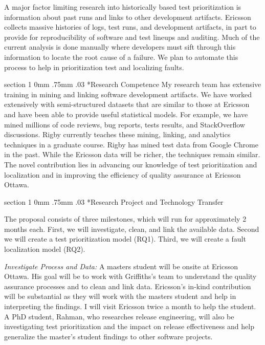 \documentclass[12pt, letterpaper]{article}
\makeatletter
\renewcommand{\section}{\@startsection
{section}%
{1}%
{0mm}%
{.75mm}
{.03\baselineskip}%
{\normalfont\large\bf} %
}
\makeatother
\begin{document}
A major factor limiting research into historically based test prioritization
is information about past runs and links to other development artifacts.
Ericsson collects massive histories of logs, test runs, and development
artifacts, in part to provide for reproducibility of software and test lineups
and auditing. Much of the current analysis is done manually where developers
must sift through this information to locate the root cause of a failure. We
plan to automate this process to help in prioritization test and localizing
faults.

\section*{Research Competence} My research team has extensive training in
mining and linking software development artifacts. We have worked extensively
with semi-structured datasets that are similar to those at Ericsson and have been
able to provide useful statistical models. For example, we have mined millions
of code reviews, bug reports, tests results, and  StackOverflow discussions.
Rigby currently teaches these mining, linking, and analytics techniques in a
graduate course. Rigby has mined test data from Google Chrome in the past.
While the Ericsson data will be richer, the techniques remain similar.
The novel contribution lies in advancing our knowledge of test prioritization
and localization and in improving the efficiency of quality assurance at
Ericsson Ottawa.

\section*{Research Project and Technology Transfer}

The proposal consists of three milestones, which will run for
approximately 2 months each. First, we will investigate, clean, and link the
available data. Second we will create a test prioritization model (RQ1). Third,
we will create a fault localization model (RQ2).

{\it Investigate Process and Data:} A masters student will be onsite at Ericsson
Ottawa. His goal will be to work with Griffiths's team to understand the
quality assurance processes and to clean and link data. Ericsson’s in-kind
contribution will be substantial as they will work with the masters student and
help in interpreting the findings. I will visit Ericsson twice a month to help
the student. A PhD student, Rahman, who researches release engineering, will
also be investigating test prioritization and the impact on release
effectiveness and help generalize the master’s student findings to other
software projects.
\end{document}

